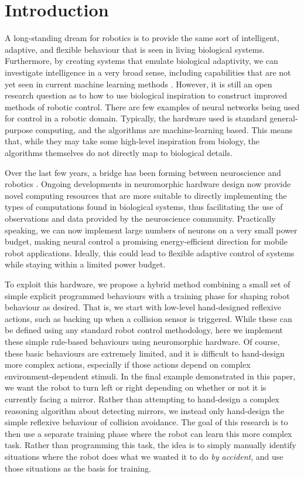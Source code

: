 \documentclass{frontiersSCNS}
\begin{document}
\section{Introduction}

A long-standing dream for robotics is to provide the same sort of
intelligent, adaptive, and flexible behaviour that is seen in living
biological systems.  Furthermore, by creating systems that emulate
biological adaptivity, we can investigate intelligence in a very broad sense,
including capabilities that are not yet seen in current machine learning
methods \citep{mcfarland1993intelligent}.  However, it is still an open
research question as to how to use biological inspiration to construct
improved methods of robotic control.  There are few examples of neural networks 
being used for control \citep{janglova2005neural} in a robotic domain. 
Typically, the hardware used is standard general-purpose computing, and the 
algorithms are machine-learning based. This means that, while they may take
some high-level inspiration from biology, the algorithms themselves do not
directly map to biological details.

Over the last few years, a bridge has been forming between neuroscience and 
robotics \citep{krichmar2011}. Ongoing developments in neuromorphic hardware 
design now provide novel computing resources that are more suitable to
directly implementing the types of computations found in biological systems, 
thus facilitating the use of observations and data provided by the 
neuroscience community. Practically speaking, we can now implement large numbers of 
neurons on a very small power budget, making neural control a promising 
energy-efficient direction for mobile robot applications.  Ideally, this could
lead to flexible adaptive control of systems while staying within a limited
power budget.

To exploit this hardware, we propose a hybrid method combining a small set of
simple explicit programmed behaviours with a training phase for shaping robot
behaviour as desired.  That is, we start with low-level hand-designed reflexive
actions, such as backing up when a collision sensor is triggered.  While these can be defined using
any standard robot control methodology, here we implement these simple rule-based
behaviours using neuromorphic hardware.  Of course, these basic behaviours
are extremely limited, and it is difficult to hand-design more complex actions,
especially if those actions depend on complex environment-dependent stimuli.
In the final example demonstrated in this paper, we want the robot to turn
left or right depending on whether or not it is currently facing a mirror.
Rather than attempting to hand-design a complex reasoning algorithm about detecting
mirrors, we instead only hand-design the simple reflexive behaviour of collision
avoidance.  The goal of this research is to then use a separate training phase
where the robot can learn this more complex task.  Rather than programming this
task, the idea is to simply manually identify situations where the robot
does what we wanted it to do \textit{by accident}, and use those situations as
the basis for training.
\end{document}
